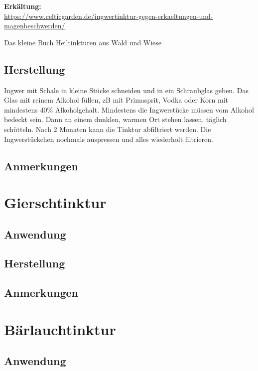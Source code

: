 \textbf{Erkältung:} \\ 

\url{https://www.celticgarden.de/ingwertinktur-gegen-erkaeltungen-und-magenbeschwerden/}

Das kleine Buch Heiltinkturen aus Wald und Wiese


\subsection{Herstellung}

Ingwer mit Schale in kleine Stücke schneiden und in ein Schraubglas geben. Das Glas mit reinem Alkohol füllen, zB mit Primasprit, Vodka oder Korn mit mindestens 40\% Alkoholgehalt. Mindestens die Ingwerstücke müssen vom Alkohol bedeckt sein. Dann an einem dunklen, warmen Ort stehen lassen, täglich schütteln. Nach 2 Monaten kann die Tinktur abfiltriert werden. Die Ingwerstückchen nochmals auspressen und alles wiederholt filtrieren.

\subsection{Anmerkungen}




\section{Gierschtinktur}

\subsection{Anwendung}

\subsection{Herstellung}

\subsection{Anmerkungen}





\section{Bärlauchtinktur}

\subsection{Anwendung}

